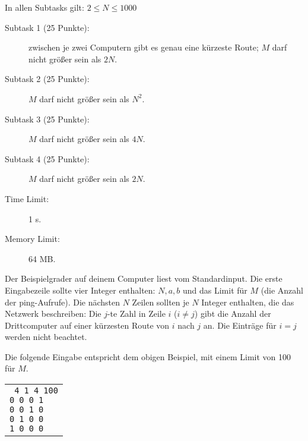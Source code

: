 \documentclass{boi2014-de}
\begin{document}
    \Scoring
    In allen Subtasks gilt:  $2 \le N \le 1000$

    \begin{description}

        \item[Subtask 1 (25 Punkte):] zwischen je zwei Computern gibt es genau eine kürzeste Route; 
        $M$ darf nicht größer sein als $2N$.
        \item[Subtask 2 (25 Punkte):] $M$ darf nicht größer sein als $N^2$.
        \item[Subtask 3 (25 Punkte):] $M$ darf nicht größer sein als $4N$.
        \item[Subtask 4 (25 Punkte):] $M$ darf nicht größer sein als $2N$.
    \end{description}

    \Constraints
    \begin{description}
        \item[Time Limit:] 1 s.
        \item[Memory Limit:] 64 MB.
    \end{description}

    \Experimentation
    Der Beispielgrader auf deinem Computer liest vom Standardinput.
    Die erste Eingabezeile sollte vier Integer enthalten: $N, a, b$ und das Limit für $M$ (die Anzahl der ping-Aufrufe).
    Die nächsten $N$ Zeilen sollten je $N$ Integer enthalten, die das Netzwerk beschreiben:
    Die $j$-te Zahl in Zeile $i$ ($i \neq j$) gibt die Anzahl der Drittcomputer auf einer kürzesten Route von $i$ nach $j$ an.
    Die Einträge für $i = j$ werden nicht beachtet.

    Die folgende Eingabe entspricht dem obigen Beispiel, mit einem Limit von 100 für $M$.

    \begin{center}
        \begin{tabular}{p{4cm}}
            {\tt
                4 1 4 100 \newline
                0 0 0 1 \newline
                0 0 1 0 \newline
                0 1 0 0 \newline
                1 0 0 0
            }
        \end{tabular}
    \end{center}
\end{document}
